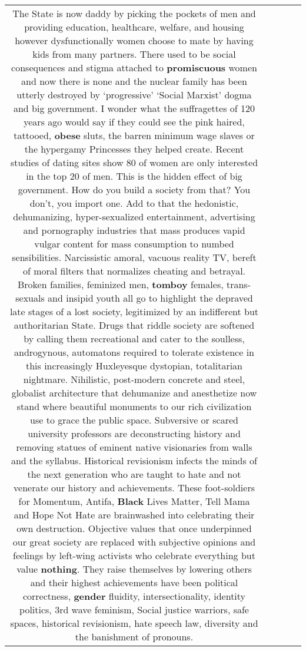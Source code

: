 \documentclass[11pt]{article}
\newlength\mylength
\begin{document}
\begin{center}
\begin{longtable}{|C{.65\mylength}|C{.30\mylength}|C{.12\mylength}|C{.12\mylength}|C{.12\mylength}|}
 The State is now daddy by picking the pockets of men and providing education, healthcare, welfare, and housing however dysfunctionally women choose to mate by having kids from many partners. There used to be social consequences and stigma attached to \textbf{promiscuous} women and now there is none and the nuclear family has been utterly destroyed by ‘progressive' ‘Social Marxist' dogma and big government. I wonder what the suffragettes of 120 years ago would say if they could see the pink haired, tattooed, \textbf{obese} sluts, the barren minimum wage slaves or the hypergamy Princesses they helped create. Recent studies of dating sites show 80 of women are only interested in the top 20 of men. This is the hidden effect of big government. How do you build a society from that? You don't, you import one. 
Add to that the hedonistic, dehumanizing, hyper-sexualized entertainment, advertising and pornography industries that mass produces vapid vulgar content for mass consumption to numbed sensibilities. Narcissistic amoral, vacuous reality TV, bereft of moral filters that normalizes cheating and betrayal. Broken families, feminized men, \textbf{tomboy} females, trans-sexuals and insipid youth all go to highlight the depraved late stages of a lost society, legitimized by an indifferent but authoritarian State. 
Drugs that riddle society are softened by calling them recreational and cater to the soulless, androgynous, automatons required to tolerate existence in this increasingly Huxleyesque dystopian, totalitarian nightmare.
Nihilistic, post-modern concrete and steel, globalist architecture that dehumanize and anesthetize now stand where beautiful monuments to our rich civilization use to grace the public space. Subversive or scared university professors are deconstructing history and removing statues of eminent native visionaries from walls and the syllabus. Historical revisionism infects the minds of the next generation who are taught to hate and not venerate our history and achievements. These foot-soldiers for Momentum, Antifa, \textbf{Black} Lives Matter, Tell Mama and Hope Not Hate are brainwashed into celebrating their own destruction.
Objective values that once underpinned our great society are replaced with subjective opinions and feelings by left-wing activists who celebrate everything but value \textbf{nothing}. They raise themselves by lowering others and their highest achievements have been political correctness, \textbf{gender} fluidity, intersectionality, identity politics, 3rd wave feminism, Social justice warriors, safe spaces, historical revisionism, hate speech law, diversity and the banishment of pronouns. 

\end{longtable}
\end{center}
\end{document}
